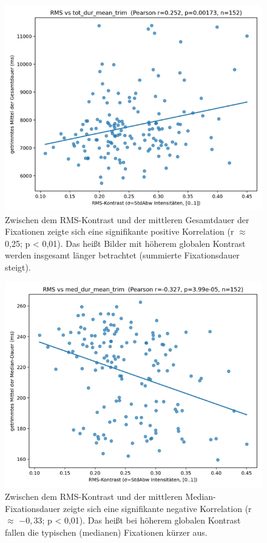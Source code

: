 \documentclass[
    language=german, %
    thesis=seminar, %
    supervisor=postdoc, %
    multiauthor=true, %
    ]{settings/csssa-thesis}
\begin{document}
\begin{figure}[h]
    \centering
    \includegraphics[width=\linewidth,height=0.8\textheight,keepaspectratio]{figures/Bild5.png}
    \caption{ Zwischen dem RMS-Kontrast und der mittleren Gesamtdauer der Fixationen zeigte sich eine signifikante positive Korrelation (r $\approx$ 0,25; p < 0,01). Das heißt Bilder mit höherem globalen Kontrast werden insgesamt länger betrachtet (summierte Fixationsdauer steigt).
}\label{fig:bild5}
\end{figure}
\begin{figure}[h]
    \centering
    \includegraphics[width=\linewidth,height=0.8\textheight,keepaspectratio]{figures/Bild6.png}
    \caption{ Zwischen dem RMS-Kontrast und der mittleren Median-Fixationsdauer zeigte sich eine signifikante negative Korrelation (r $\approx$ $-0,33$; p < 0,01). Das heißt bei höherem globalen Kontrast fallen die typischen (medianen) Fixationen kürzer aus.
 }\label{fig:bild6}
\end{figure}
\end{document}
